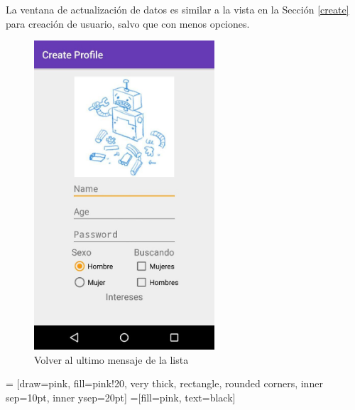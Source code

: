 \documentclass[10pt,letterpaper,extrafontsizes]{memoir}
\begin{document}
La ventana de actualización de datos es similar a la vista en la Sección \ref{create} para creación de usuario, salvo que con menos opciones.

\begin{figure}[H]
    \centering
\includegraphics[width=0.6\textwidth]{graficos/capturas/i}
    \caption{Volver al ultimo mensaje de la lista}
    \label{fig:chatDown}
\end{figure}

\begin{center}
 = [draw=pink, fill=pink!20, very thick,
    rectangle, rounded corners, inner sep=10pt, inner ysep=20pt]
 =[fill=pink, text=black]
\end{center}
%
\end{document}
